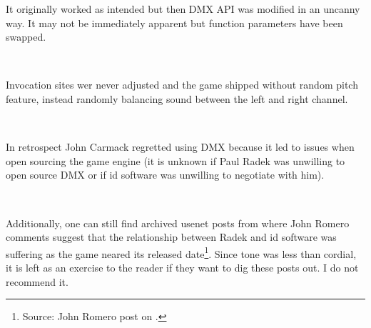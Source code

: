 It originally worked as intended but then DMX API was modified in an uncanny way. It may not be immediately apparent but function  parameters have been swapped.\\
\par
{}\\
\par
 Invocation sites wer never adjusted and the game shipped without random pitch feature, instead randomly balancing sound between the left and right channel.\\
\par
{}\\
\par
In retrospect John Carmack regretted using DMX because it led to issues when open sourcing the game engine (it is unknown if Paul Radek was unwilling to open source DMX or if id software was unwilling to negotiate with him).\\
\par
{}\\
\par
Additionally, one can still find archived usenet posts from  where John Romero comments suggest that the relationship between Radek and id software was suffering as the game neared its released date\footnote{Source: John Romero post on .}. Since tone was less than cordial, it is left as an exercise to the reader if they want to dig these posts out. I do not recommend it.



